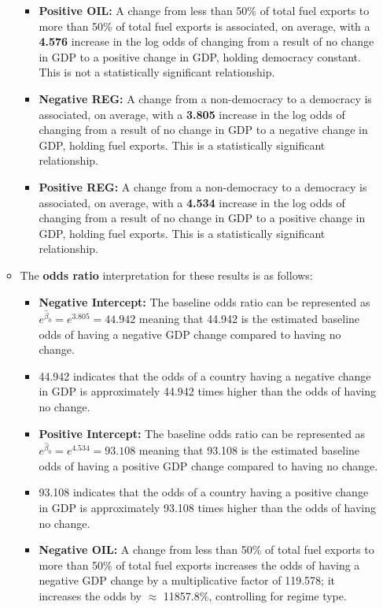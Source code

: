 \documentclass[12pt,letterpaper]{article}
\begin{document}
\begin{enumerate}
\begin{itemize}
\begin{itemize}
					\item \textbf{Positive OIL:}  A change from less than 50\% of total fuel exports to more than 50\% of total fuel exports is associated, on average, with a \textbf{4.576} increase in the log odds of changing from a result of no change in GDP to a positive change in GDP, holding democracy constant. This is not a statistically significant relationship. 
					
					\item \textbf{Negative REG:}  A change from a non-democracy to a democracy is associated, on average, with a \textbf{3.805} increase in the log odds of changing from a result of no change in GDP to a negative change in GDP, holding fuel exports. This is a statistically significant relationship. 
					
					\item \textbf{Positive REG:}  A change from a non-democracy to a democracy is associated, on average, with a \textbf{4.534} increase in the log odds of changing from a result of no change in GDP to a positive change in GDP, holding fuel exports. This is a statistically significant relationship.
					
				\end{itemize}
	
			\item The \textbf{odds ratio} interpretation for these results is as follows:
				\begin{itemize}
					\item \textbf{Negative Intercept:} The baseline odds ratio can be represented as $e^{\hat{\beta}_0} = e^{3.805} = 44.942$ meaning that 44.942 is the estimated baseline odds of having a negative GDP change compared to having no change.
					\item 44.942 indicates that the odds of a country having a negative change in GDP is approximately 44.942 times higher than the odds of having no change.

					\item \textbf{Positive Intercept:} The baseline odds ratio can be represented as $e^{\hat{\beta}_0} = e^{4.534} = 93.108$ meaning that 93.108 is the estimated baseline odds of having a positive GDP change compared to having no change.
					\item 93.108 indicates that the odds of a country having a positive change in GDP is approximately 93.108 times higher than the odds of having no change.
					
					
					\item \textbf{Negative OIL:} A change from less than 50\% of total fuel exports to more than 50\% of total fuel exports increases the odds of having a negative GDP change by a multiplicative factor of 119.578; it increases the odds by $\approx$ 11857.8\%, controlling for regime type.
					

\end{itemize}
\end{itemize}
\end{enumerate}
\end{document}
